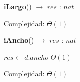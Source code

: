 \begin{Algoritmos}
\begin{algorithm}[H]{\textbf{iLargo}() $\to$ $res$ : $nat$}
\begin{algorithmic}[1]
			\medskip
			\Statex \underline{Complejidad:} $\Theta(1)$
        \end{algorithmic}
\end{algorithm}

\begin{algorithm}[H]{\textbf{iAncho}() $\to$ $res$ : $nat$}
    	\begin{algorithmic}[1]
            \State $res \gets d.ancho$ \Comment $\Theta(1)$

			\medskip
			\Statex \underline{Complejidad:} $\Theta(1)$
        \end{algorithmic}
\end{algorithm}

\end{Algoritmos}
